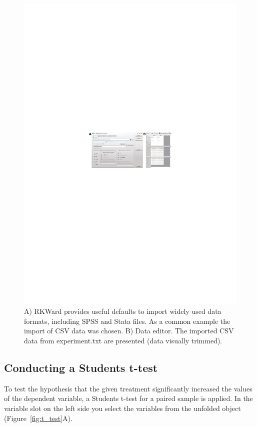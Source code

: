 \begin{figure}[htp]
 \centering
 \includegraphics[clip=true,trim=0cm 5.7cm 0cm 5.7cm,width=16cm]{../figures/import_data.pdf}
 \caption{A) RKWard provides useful defaults
to import widely used data formats, including SPSS and Stata files. As
a common example the import of CSV data was chosen. B) Data editor. The imported CSV
data from experiment.txt are presented (data visually trimmed).}
 \label{fig:import_data}
\end{figure}

\subsection{Conducting a Students t-test}
\label{sec:conducting_ttest}
To test the hypothesis that the given treatment significantly increased
the values of the dependent variable, a Students
t-test for a paired sample is applied. In the variable slot on the left
side you select the variables from the unfolded
 object (Figure~\ref{fig:t_test}A).

